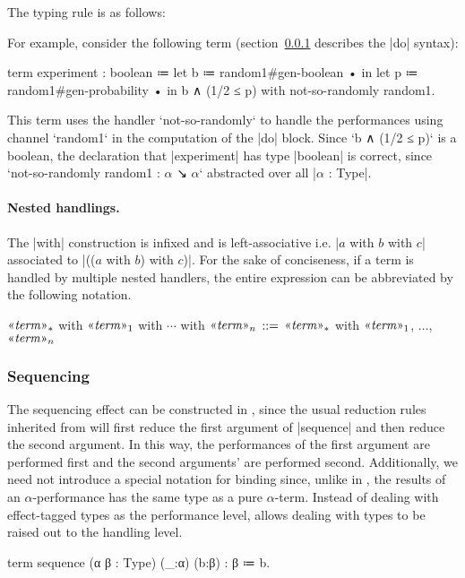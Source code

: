 The typing rule is as follows:


\newparagraph
For example, consider the following term (section~\ref{sec:LangD-sequencing} describes the \code|do| syntax):
\begin{snippet}
term experiment : boolean
  ≔ let b ≔ random1#gen-boolean • in
    let p ≔ random1#gen-probability • in
    b ∧ (1/2 ≤ p)
    with not-so-randomly random1.
\end{snippet}
This term uses the handler \code`not-so-randomly` to handle the performances using channel \code`random1` in the computation of the \code|do| block.
Since \code`b ∧ (1/2 ≤ p)` is a boolean, the declaration that \code|experiment| has type \code|boolean| is correct, since \code`not-so-randomly random1 : $α$ ↘ $α$` abstracted over all \code|$α$ : Type|.

\paragraph{Nested handlings.}
The \code|with| construction is infixed and is left-associative
i.e. \code|$a$ with $b$ with $c$| associated to \code|(($a$ with $b$) with $c$)|.
For the sake of conciseness, if a term is handled by multiple nested handlers, the entire expression can be abbreviated by the following notation.
\begin{notational}[caption={Notation for nested handlings}]
$\mvar{term}_*$ with $\mvar{term}_1$ with $\cdots$ with $\mvar{term}_n$
  $\syneq$
    $\mvar{term}_*$ with $\mvar{term}_1$, $\dots$, $\mvar{term}_n$
\end{notational}

\subsubsection{Sequencing}
\label{sec:LangD-sequencing}

The sequencing effect can be constructed in \LangD, since the usual reduction rules inherited from \LangA will first reduce the first argument of \code|sequence| and then reduce the second argument.
In this way, the performances of the first argument are performed first and the second arguments' are performed second.
Additionally, we need not introduce a special notation for binding since, unlike in \LangC, the results of an $α$-performance has the same type as a pure $α$-term.
Instead of dealing with effect-tagged types as the performance level, \LangD allows dealing with types to be raised out to the handling level.
%
\begin{program}[caption={Construction for sequencing}]
term sequence (α β : Type) (_:α) (b:β) : β ≔ b.
\end{program}

